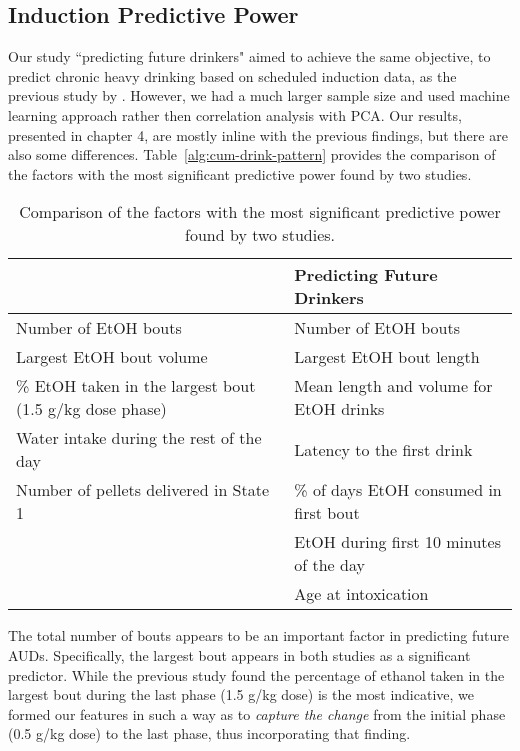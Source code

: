 \subsection{Induction Predictive Power}
Our study ``predicting future drinkers" aimed to achieve the same objective, to predict chronic heavy drinking based on scheduled induction data, as the previous study by . However, we had a much larger sample size and used machine learning approach rather then correlation analysis with PCA. Our results, presented in chapter 4, are mostly inline with the previous findings, but there are also some differences. Table~\ref{alg:cum-drink-pattern}  provides the comparison of the factors with the most significant predictive power found by two studies.

\begin{table}[h]
	\centering
	\caption{Comparison of the factors with the most significant predictive power found by two studies.}
	\label{tab:factors-comparison}
	\begin{tabular}{p{2.8in}p{2.8in}}
		\hline
		\abovespace\belowspace
		\shortcite{grant2008drinking} & Predicting Future Drinkers \\
		\hline
		Number of EtOH bouts & Number of EtOH bouts \\
		Largest EtOH bout volume & Largest EtOH bout length \\ 
		\% EtOH taken in the largest bout (1.5 g/kg dose phase) & Mean length and volume for EtOH drinks\\
		Water intake during the rest of the day & Latency to the first drink\\
		Number of pellets delivered in State 1 & \% of days EtOH consumed in first bout\\
		& EtOH during first 10 minutes of the day\\
		& Age at intoxication\\
		\hline
	\end{tabular}
\end{table}

The total number of bouts appears to be an important factor in predicting future AUDs. Specifically, the largest bout appears in both studies as a significant predictor. While the previous study found the percentage of ethanol taken in the largest bout during the last phase (1.5 g/kg dose) is the most indicative, we formed our features in such a way as to \textit{capture the change} from the initial phase (0.5 g/kg dose) to the last phase, thus incorporating that finding.  

